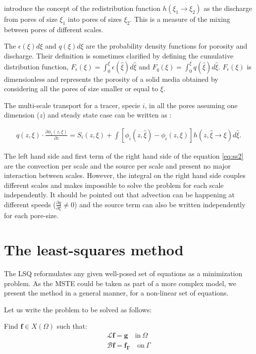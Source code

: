 \documentclass{CFD2011}
\newcommand{\TODO}[1]{\textcolor{blue}{TODO: #1} \\}
\begin{document}
\cite{DupuySchwarz} introduce the concept of the redistribution function $h(\xi_1 \rightarrow \xi_2)$ as the discharge from pores of size $\xi_1$ into pores of sizes $\xi_2$. This is a measure of the mixing between pores of different scales.

The $\epsilon(\xi)d\xi$ and $q(\xi)d\xi$ are the probability density functions for porosity and discharge. Their definition is sometimes clarified by defining the cumulative distribution function, $F_{\epsilon}(\xi)=\int_0^{\xi}\epsilon(\hat \xi)d\hat\xi$ and $F_{q}(\xi)=\int_0^{\xi}q(\hat\xi)d\hat\xi$. $F_{\epsilon}(\xi)$ is dimensionless and represents the porosity of a solid media obtained by considering all the pores of size smaller or equal to $\xi$.

The multi-scale transport for a tracer, specie $i$, in all the pores assuming one dimension ($z$) and steady state case can be written as \citep{DupuySchwarz}:

\begin{align}
q(z, \xi) \cdot \frac{\partial \phi_{i}(z, \xi)}{\partial z}  = 
 S_{i}(z, \xi) + \int [\phi_{i}(z, \hat \xi) - \phi_{i}(z, \xi)] h(z, \hat \xi \rightarrow \xi) d\hat \xi . 
\label{eq:ss2}
\end{align}

The left hand side and first term of the right hand side of the equation \ref{eq:ss2} are the convection per scale and the source per scale and present no major interaction between scales. However, the integral on the right hand side couples different scales and makes impossible to solve the problem for each scale independently. It should be pointed out that advection can be happening at different speeds ($\tfrac{\partial q}{\partial \xi} \neq 0$) and the source term can also be written independently for each pore-size.


\section{The least-squares method}
The LSQ reformulates any given well-posed set of equations as a minimization problem. As the MSTE could be taken as part of a more complex model, we present the method in a general manner, for a non-linear set of equations. 

Let us write the problem to be solved as follows: 

Find $\mathbf{f}\in X(\Omega)$ such that:
\begin{eqnarray}
\mathcal{L} \mathbf{f} = \mathbf{g} \quad \mbox{in} \ \Omega \label{eq:Problem} \\
\mathcal{B} \mathbf{f} = \mathbf{f_\Gamma} \quad \mbox{on} \ \Gamma \label{eq:Boundary}
\end{eqnarray}
\end{document}
